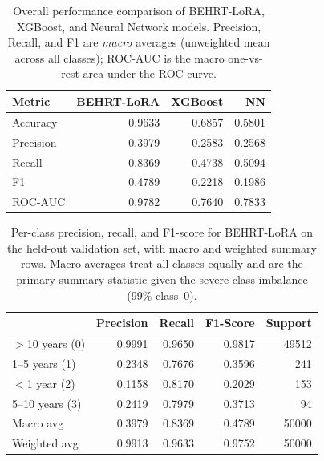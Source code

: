 \documentclass{article}
\begin{document}
\begin{table}
\caption{Overall performance comparison of BEHRT-LoRA, XGBoost, and Neural Network models. Precision, Recall, and F1 are \textit{macro} averages (unweighted mean across all classes); ROC-AUC is the macro one-vs-rest area under the ROC curve.}
\label{tab:overall_comparison}
\begin{tabular}{lrrr}
\toprule
Metric & BEHRT-LoRA & XGBoost & NN \\
\midrule
Accuracy  & 0.9633 & 0.6857 & 0.5801 \\
Precision & 0.3979 & 0.2583 & 0.2568 \\
Recall    & 0.8369 & 0.4738 & 0.5094 \\
F1        & 0.4789 & 0.2218 & 0.1986 \\
ROC-AUC   & 0.9782 & 0.7640 & 0.7833 \\
\bottomrule
\end{tabular}
\end{table}


\begin{table}
\caption{Per-class precision, recall, and F1-score for BEHRT-LoRA on the held-out validation set, with macro and weighted summary rows. Macro averages treat all classes equally and are the primary summary statistic given the severe class imbalance (99\% class~0).}
\label{tab:classification_report}
\begin{tabular}{lrrrr}
\toprule
 & Precision & Recall & F1-Score & Support \\
\midrule
$>$10 years (0) & 0.9991 & 0.9650 & 0.9817 & 49512 \\
1–5 years (1) & 0.2348 & 0.7676 & 0.3596 & 241 \\
$<$1 year (2) & 0.1158 & 0.8170 & 0.2029 & 153 \\
5–10 years (3) & 0.2419 & 0.7979 & 0.3713 & 94 \\
Macro avg & 0.3979 & 0.8369 & 0.4789 & 50000 \\
Weighted avg & 0.9913 & 0.9633 & 0.9752 & 50000 \\
\bottomrule
\end{tabular}
\end{table}
\end{document}
